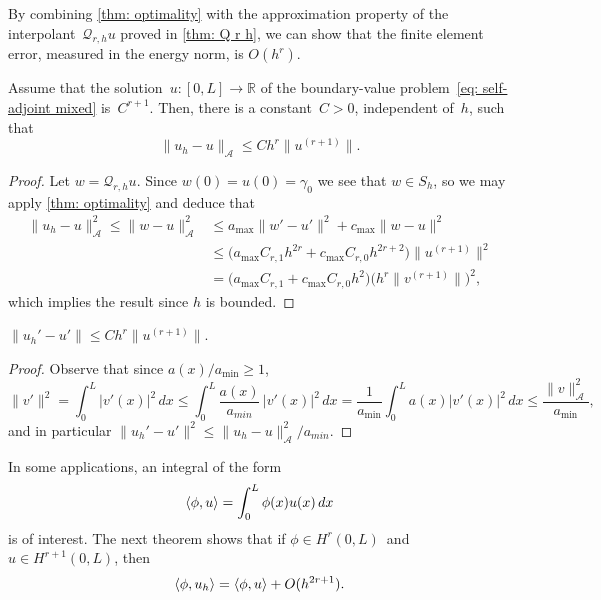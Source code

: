 By combining \cref{thm: optimality} with the approximation property of the 
interpolant~$\mathcal{Q}_{r,h}u$ proved in \cref{thm: Q r h}, we can show
that the finite element error, measured in the energy norm, is $O(h^r)$.

\begin{theorem}\label{thm: uh-u L}
Assume that the solution~$u:[0,L]\to\mathbb{R}$ of the boundary-value 
problem~\eqref{eq: self-adjoint mixed} is~$C^{r+1}$.  Then,
there is a constant~$C>0$, independent of~$h$, such that
\[
\|u_h-u\|_{\mathcal{A}}\le Ch^r\|u^{(r+1)}\|.
\]
\end{theorem}
\begin{proof}
Let $w=\mathcal{Q}_{r,h}u$.  Since $w(0)=u(0)=\gamma_0$ we see that $w\in S_h$,
so we may apply \cref{thm: optimality} and deduce that
\begin{align*}
\|u_h-u\|_{\mathcal{A}}^2\le\|w-u\|_{\mathcal{A}}^2
	&\le a_{\max}\|w'-u'\|^2+c_{\max}\|w-u\|^2\\
	&\le\bigl(a_{\max}C_{r,1}h^{2r}+c_{\max}C_{r,0}h^{2r+2}\bigr)
	\|u^{(r+1)}\|^2\\
	&=\bigl(a_{\max}C_{r,1}+c_{\max}C_{r,0}h^2\bigr)
	\bigl(h^r\|v^{(r+1)}\|\bigr)^2,
\end{align*}
which implies the result since $h$ is bounded.
\end{proof}
\begin{corollary}
$\|u_h'-u'\|\le Ch^r\|u^{(r+1)}\|$.
\end{corollary}
\begin{proof}
Observe that since $a(x)/a_{\min}\ge1$,
\[
\|v'\|^2=\int_0^L|v'(x)|^2\,dx\le\int_0^L\frac{a(x)}{a_{min}}\,|v'(x)|^2\,dx
	=\frac{1}{a_{\min}}\int_0^La(x)|v'(x)|^2\,dx
	\le\frac{\|v\|_{\mathcal{A}}^2}{a_{\min}},
\]
and in particular $\|u_h'-u'\|^2\le\|u_h-u\|^2_{\mathcal{A}}/a_{min}$.
\end{proof}

In some applications, an integral of the form
\[
\langle\phi,u\rangle=\int_0^L\phi(x)u(x)\,dx
\]
is of interest.  The next theorem shows that if $\phi\in H^r(0,L)$~and 
$u\in H^{r+1}(0,L)$, then
\[
\langle\phi,u_h\rangle=\langle\phi,u\rangle+O(h^{2r+1}).
\]

